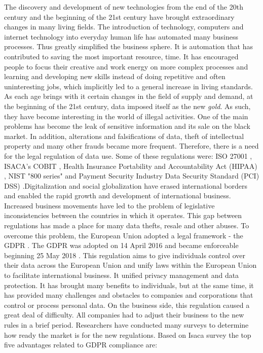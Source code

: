 \documentclass[11pt,english]{article}
\begin{document}
\quad The discovery and development of new technologies from the end of the 20th century and the beginning of the 21st century have brought extraordinary changes in many living fields. The introduction of technology, computers and internet technology into everyday human life has automated many business processes. Thus greatly simplified the business sphere. It is automation that has contributed to saving the most important resource, time. It has encouraged people to focus their creative and work energy on more complex processes and learning and developing new skills instead of doing repetitive and often uninteresting jobs, which implicitly led to a general increase in living standards. \newline As each age brings with it certain changes in the field of supply and demand, at the beginning of the 21st century, data imposed itself as the new \emph{gold}. As such, they have become interesting in the world of illegal activities. One of the main problems has become the leak of sensitive information and its sale on the black market. In addition, alterations and falsifications of data, theft of intellectual property and many other frauds became more frequent. Therefore, there is a need for the legal regulation of data use. Some of these regulations were: ISO 27001 \cite{iso}, ISACA's COBIT \cite{cobit}, Health Insurance Portability and Accountability Act (HIPAA) \cite{hipaa}, NIST "800 series" \cite{nist} and Payment Security Industry Data Security Standard (PCI) DSS) \cite{pci}.\newline Digitalization and social globalization have erased international borders and enabled the rapid growth and development of international business. Increased business movements have led to the problem of legislative inconsistencies between the countries in which it operates. This gap between regulations has made a place for many data thefts, resale and other abuses. To overcome this problem, the European Union adopted a legal framework - the GDPR \cite{gdprRegulation}. The GDPR was adopted on 14 April 2016 and became enforceable beginning 25 May 2018 \cite{gdpr}. This regulation aims to give individuals control over their data across the European Union and unify laws within the European Union to facilitate international business. It unified privacy management and data protection. It has brought many benefits to individuals, but at the same time, it has provided many challenges and obstacles to companies and corporations that control or process personal data. On the business side, this regulation caused a great deal of difficulty. All companies had to adjust their business to the new rules in a brief period. \newline \quad Researchers have conducted many surveys to determine how ready the market is for the new regulations. Based on Isaca survey \cite{isaca} the top five advantages related to GDPR compliance are:
\end{document}
